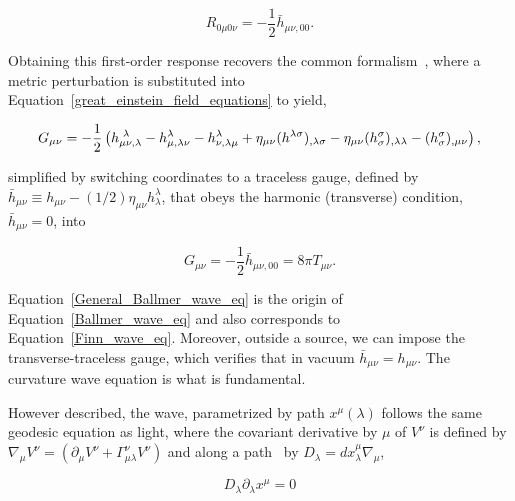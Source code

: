 \begin{equation}
R_{0\mu0\nu} = -\frac{1}{2} \bar{h}_{\mu\nu,00}.
\label{Finn_wave_eq}
\end{equation}


\noindent Obtaining this first-order response recovers the common formalism~\cite{BallmerThesis}, where a metric perturbation is substituted into Equation~\ref{great_einstein_field_equations} to yield,

\begin{equation}
G_{\mu\nu} = -\frac{1}{2}\left(h_{\mu\nu,\lambda}^{\textup{       }\lambda} - h^\lambda_{\mu,\lambda\nu} -
h^\lambda_{\nu,\lambda\mu} + \eta_{\mu\nu}(h^{\lambda\sigma})_{,\lambda\sigma} - \eta_{\mu\nu}(h_\sigma^\sigma)_{,\lambda\lambda} - (h_\sigma^\sigma)_{,\mu\nu}  \right),
\end{equation}

\noindent simplified by switching coordinates to a traceless gauge, defined by $\bar{h}_{\mu\nu}\equiv h_{\mu\nu} - (1/2)\eta_{\mu\nu}h_\lambda^\lambda$, that obeys the harmonic (transverse) condition, $\bar{h}_{\mu\nu} = 0$, into

\begin{equation}
G_{\mu\nu} = -\frac{1}{2} \bar{h}_{\mu\nu,00} = 8 \pi T_{\mu\nu}.
\label{General_Ballmer_wave_eq}
\end{equation}

\noindent Equation~\ref{General_Ballmer_wave_eq} is the origin of Equation~\ref{Ballmer_wave_eq} and also corresponds to Equation~\ref{Finn_wave_eq}. 
Moreover, outside a source, we can impose the transverse-traceless gauge, which verifies that in vacuum $\bar{h}_{\mu\nu} = h_{\mu\nu}$.
The curvature wave equation is what is fundamental.

However described, the wave, parametrized by path $x^\mu (\lambda)$ follows the same geodesic equation as light, where the covariant derivative by $\mu$ of $V^\nu$ is defined by $\nabla_\mu V^\nu = (\partial_\mu V^\nu + \Gamma^\nu_{\mu\lambda} V^\nu)$ and along a path~\cite{Carroll1997} by $D_\lambda = dx^\mu_\lambda \nabla_\mu$,

\begin{equation}
D_\lambda \partial_\lambda x^\mu = 0
\end{equation}

